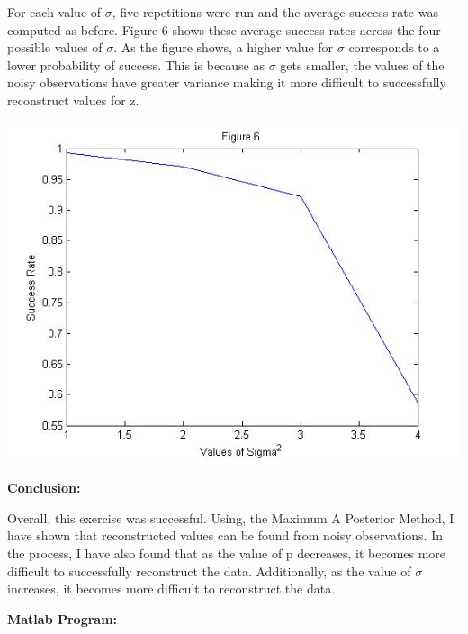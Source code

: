 \documentclass[12pt]{article} %
\begin{document}
\vspace{3mm}
For each value of $\sigma$, five repetitions were run and the average success rate was computed as before. Figure 6 shows these average success rates across the four possible values of $\sigma$. As the figure shows, a higher value for $\sigma$ corresponds to a lower probability of success. This is because as $\sigma$ gets smaller, the values of the noisy observations have greater variance making it more difficult to successfully reconstruct values for z.

\begin{center}
\includegraphics[scale = 0.5]{figure6}
\end{center}

\vspace{3mm}
\noindent
\textbf{Conclusion:}

\vspace{3mm}
Overall, this exercise was successful. Using, the Maximum A Posterior Method, I have shown that reconstructed values can be found from noisy observations. In the process, I have also found that as the value of p decreases, it becomes more difficult to successfully reconstruct the data. Additionally, as the value of $\sigma$ increases, it becomes more difficult to reconstruct the data.

\pagebreak
\noindent
\textbf{Matlab Program:}
\end{document}
